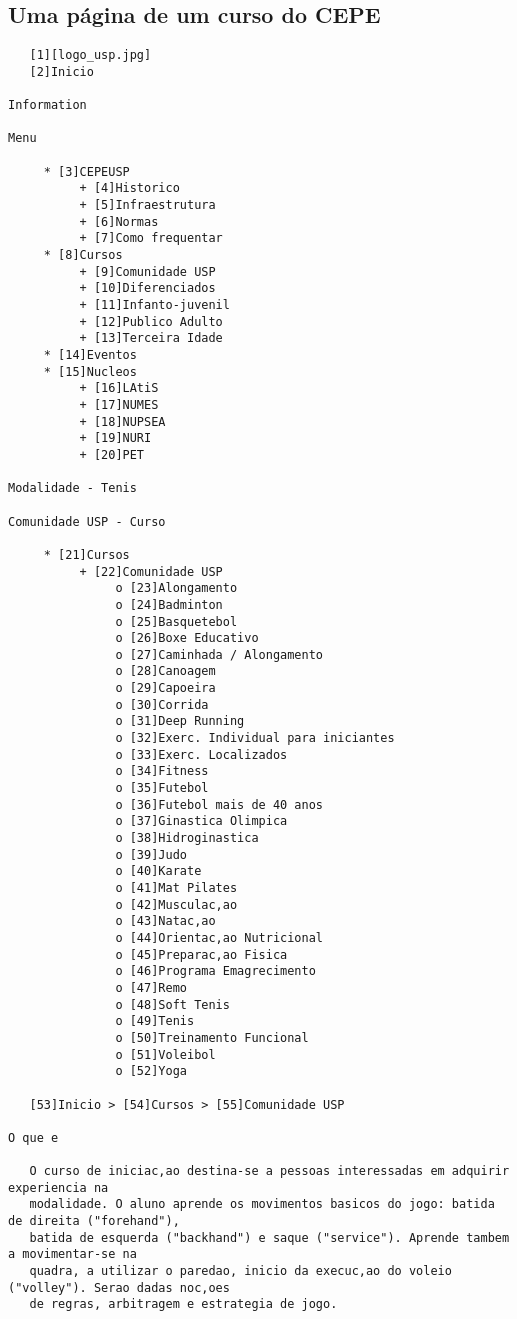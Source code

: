 \documentclass[brazil]{article}
\begin{document}
\subsection{Uma página de um curso do CEPE}
\begin{small}
\begin{verbatim}
   [1][logo_usp.jpg]
   [2]Inicio

Information

Menu

     * [3]CEPEUSP
          + [4]Historico
          + [5]Infraestrutura
          + [6]Normas
          + [7]Como frequentar
     * [8]Cursos
          + [9]Comunidade USP
          + [10]Diferenciados
          + [11]Infanto-juvenil
          + [12]Publico Adulto
          + [13]Terceira Idade
     * [14]Eventos
     * [15]Nucleos
          + [16]LAtiS
          + [17]NUMES
          + [18]NUPSEA
          + [19]NURI
          + [20]PET

Modalidade - Tenis

Comunidade USP - Curso

     * [21]Cursos
          + [22]Comunidade USP
               o [23]Alongamento
               o [24]Badminton
               o [25]Basquetebol
               o [26]Boxe Educativo
               o [27]Caminhada / Alongamento
               o [28]Canoagem
               o [29]Capoeira
               o [30]Corrida
               o [31]Deep Running
               o [32]Exerc. Individual para iniciantes
               o [33]Exerc. Localizados
               o [34]Fitness
               o [35]Futebol
               o [36]Futebol mais de 40 anos
               o [37]Ginastica Olimpica
               o [38]Hidroginastica
               o [39]Judo
               o [40]Karate
               o [41]Mat Pilates
               o [42]Musculac,ao
               o [43]Natac,ao
               o [44]Orientac,ao Nutricional
               o [45]Preparac,ao Fisica
               o [46]Programa Emagrecimento
               o [47]Remo
               o [48]Soft Tenis
               o [49]Tenis
               o [50]Treinamento Funcional
               o [51]Voleibol
               o [52]Yoga

   [53]Inicio > [54]Cursos > [55]Comunidade USP

O que e

   O curso de iniciac,ao destina-se a pessoas interessadas em adquirir experiencia na
   modalidade. O aluno aprende os movimentos basicos do jogo: batida de direita ("forehand"),
   batida de esquerda ("backhand") e saque ("service"). Aprende tambem a movimentar-se na
   quadra, a utilizar o paredao, inicio da execuc,ao do voleio ("volley"). Serao dadas noc,oes
   de regras, arbitragem e estrategia de jogo.


\end{verbatim}
\end{small}
\end{document}
